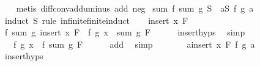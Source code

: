 \begin{isabellebody}
%
\isadelimproof
\ \ %
\endisadelimproof
%
\isatagproof
{}\isamarkupfalse%
\ {\isacharparenleft}{\kern0pt}metis\ diff{\isacharunderscore}{\kern0pt}conv{\isacharunderscore}{\kern0pt}add{\isacharunderscore}{\kern0pt}uminus\ add\ neg{\isacharparenright}{\kern0pt}%
\endisatagproof
{\isafoldproof}%
%
\isadelimproof
\isanewline
%
\endisadelimproof
\isanewline
{}\isamarkupfalse%
\ sum{\isacharcolon}{\kern0pt}\ {\isachardoublequoteopen}f\ {\isacharparenleft}{\kern0pt}sum\ g\ S{\isacharparenright}{\kern0pt}\ {\isacharequal}{\kern0pt}\ {\isacharparenleft}{\kern0pt}{\isasymSum}a{\isasymin}S{\isachardot}{\kern0pt}\ f\ {\isacharparenleft}{\kern0pt}g\ a{\isacharparenright}{\kern0pt}{\isacharparenright}{\kern0pt}{\isachardoublequoteclose}\isanewline
%
\isadelimproof
%
\endisadelimproof
%
\isatagproof
{}\isamarkupfalse%
\ {\isacharparenleft}{\kern0pt}induct\ S\ rule{\isacharcolon}{\kern0pt}\ infinite{\isacharunderscore}{\kern0pt}finite{\isacharunderscore}{\kern0pt}induct{\isacharparenright}{\kern0pt}\isanewline
\ \ \isamarkupfalse%
\ {\isacharparenleft}{\kern0pt}insert\ x\ F{\isacharparenright}{\kern0pt}\isanewline
\ \ \isamarkupfalse%
\ {\isachardoublequoteopen}f\ {\isacharparenleft}{\kern0pt}sum\ g\ {\isacharparenleft}{\kern0pt}insert\ x\ F{\isacharparenright}{\kern0pt}{\isacharparenright}{\kern0pt}\ {\isacharequal}{\kern0pt}\ f\ {\isacharparenleft}{\kern0pt}g\ x\ {\isacharplus}{\kern0pt}\ sum\ g\ F{\isacharparenright}{\kern0pt}{\isachardoublequoteclose}\isanewline
\ \ \ \ \isamarkupfalse%
\ insert{\isachardot}{\kern0pt}hyps\ \isamarkupfalse%
\ simp\isanewline
\ \ \isamarkupfalse%
\ \isamarkupfalse%
\ {\isachardoublequoteopen}{\isasymdots}\ {\isacharequal}{\kern0pt}\ f\ {\isacharparenleft}{\kern0pt}g\ x{\isacharparenright}{\kern0pt}\ {\isacharplus}{\kern0pt}\ f\ {\isacharparenleft}{\kern0pt}sum\ g\ F{\isacharparenright}{\kern0pt}{\isachardoublequoteclose}\isanewline
\ \ \ \ \isamarkupfalse%
\ add\ \isamarkupfalse%
\ simp\isanewline
\ \ \isamarkupfalse%
\ \isamarkupfalse%
\ {\isachardoublequoteopen}{\isasymdots}\ {\isacharequal}{\kern0pt}\ {\isacharparenleft}{\kern0pt}{\isasymSum}a{\isasymin}insert\ x\ F{\isachardot}{\kern0pt}\ f\ {\isacharparenleft}{\kern0pt}g\ a{\isacharparenright}{\kern0pt}{\isacharparenright}{\kern0pt}{\isachardoublequoteclose}\isanewline
\ \ \ \ \isamarkupfalse%
\ insert{\isachardot}{\kern0pt}hyps\ \isamarkupfalse%

\end{isabellebody}
